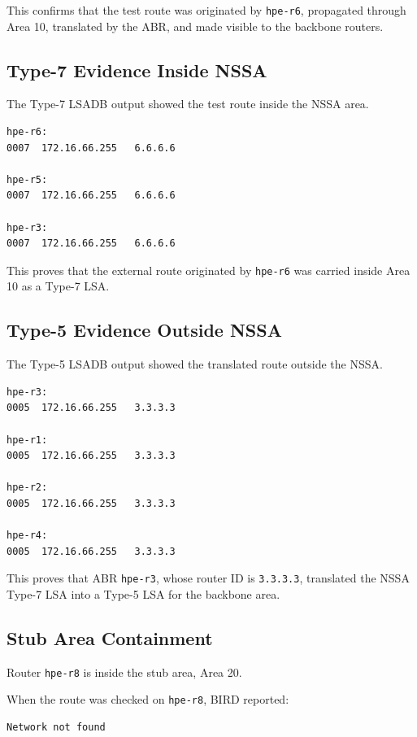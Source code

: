 This confirms that the test route was originated by \texttt{hpe-r6}, propagated through Area 10, translated by the ABR, and made visible to the backbone routers.

\subsection{Type-7 Evidence Inside NSSA}

The Type-7 LSADB output showed the test route inside the NSSA area.

\begin{verbatim}
hpe-r6:
0007  172.16.66.255   6.6.6.6

hpe-r5:
0007  172.16.66.255   6.6.6.6

hpe-r3:
0007  172.16.66.255   6.6.6.6
\end{verbatim}

This proves that the external route originated by \texttt{hpe-r6} was carried inside Area 10 as a Type-7 LSA.

\subsection{Type-5 Evidence Outside NSSA}

The Type-5 LSADB output showed the translated route outside the NSSA.

\begin{verbatim}
hpe-r3:
0005  172.16.66.255   3.3.3.3

hpe-r1:
0005  172.16.66.255   3.3.3.3

hpe-r2:
0005  172.16.66.255   3.3.3.3

hpe-r4:
0005  172.16.66.255   3.3.3.3
\end{verbatim}

This proves that ABR \texttt{hpe-r3}, whose router ID is \texttt{3.3.3.3}, translated the NSSA Type-7 LSA into a Type-5 LSA for the backbone area.

\subsection{Stub Area Containment}

Router \texttt{hpe-r8} is inside the stub area, Area 20.

When the route was checked on \texttt{hpe-r8}, BIRD reported:

\begin{verbatim}
Network not found
\end{verbatim}

